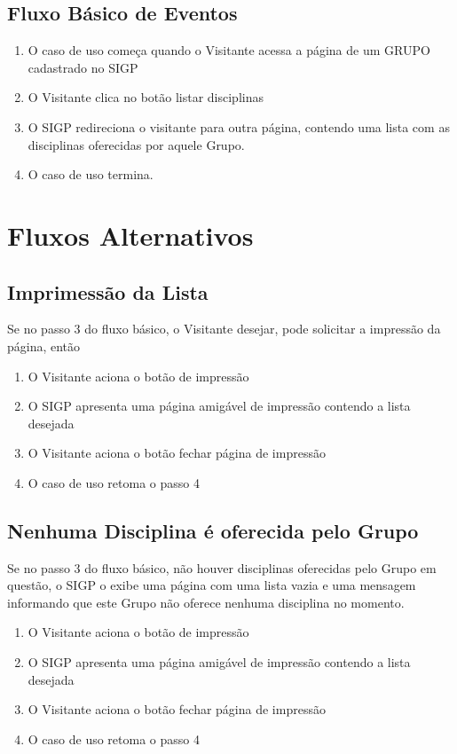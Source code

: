 \documentclass[11pt, a4paper,oneside]{book}
\begin{document}
\subsection{Fluxo Básico de Eventos}

\begin{enumerate}
\item O caso de uso começa quando o Visitante acessa a página de um GRUPO cadastrado no SIGP
\item O Visitante clica no botão listar disciplinas
\item O SIGP redireciona o visitante para outra página, contendo uma lista com as disciplinas oferecidas por aquele Grupo.
\item O caso de uso termina.
\end{enumerate}

\section{Fluxos Alternativos}

\subsection{Imprimessão da Lista}
Se no passo $3$ do fluxo básico, o Visitante desejar, pode solicitar a impressão da página, então

\begin{enumerate}
\item O Visitante aciona o botão de impressão
\item O SIGP apresenta uma página amigável de impressão contendo a lista desejada
\item O Visitante aciona o botão fechar página de impressão
\item O caso de uso retoma o passo 4
\end{enumerate}

\subsection{Nenhuma Disciplina é oferecida pelo Grupo}
Se no passo $3$ do fluxo básico, não houver disciplinas oferecidas pelo Grupo em questão, o SIGP o exibe uma página com uma lista vazia e uma mensagem informando que este Grupo não oferece nenhuma disciplina no momento.

\begin{enumerate}
\item O Visitante aciona o botão de impressão
\item O SIGP apresenta uma página amigável de impressão contendo a lista desejada
\item O Visitante aciona o botão fechar página de impressão
\item O caso de uso retoma o passo 4
\end{enumerate}
\end{document}
